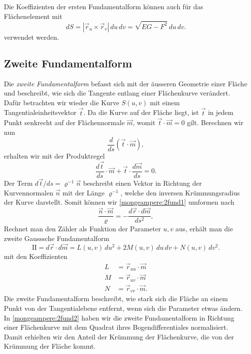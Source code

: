 Die Koeffizienten der ersten Fundamentalform können auch für das Flächenelement mit
\begin{equation}
  d S = |\vec r_u \times \vec r_v|\,d u \,d v = \!\sqrt{EG-F^2} \,d u \,d v.
  \label{mongeampere:ds}
\end{equation}
verwendet werden.

\subsection{Zweite Fundamentalform}
Die \emph{zweite Fundamentalform} befasst sich mit der äusseren Geometrie einer 
%
%
Fläche und beschreibt, wie sich die Tangente entlang einer Flächenkurve verändert.
Dafür betrachten wir wieder die Kurve $S(u,v)$ mit einem Tangentialeinheitsvektor 
$\vec t$.
Da die Kurve auf der Fläche liegt, ist $\vec t$ in jedem Punkt senkrecht auf der 
Flächennormale $\vec m$, womit $\vec t \cdot \vec m = 0$ gilt. 
Berechnen wir nun 
\begin{equation*}
  \frac{d }{d s}(\vec t \cdot \vec m),
\end{equation*}
erhalten wir mit der Produktregel
\begin{equation}
  \frac{d \vec t}{d s} \cdot \vec m + \vec t \cdot \frac{d \vec m}{d s} = 0. 
  \label{mongeampere:2fund1}
\end{equation}
Der Term $d \vec t / d s = \varrho^{-1} \vec n$ beschreibt einen Vektor in Richtung der Kurvennormalen 
$\vec n$ mit der Länge $\varrho^{-1}$, welche den inversen Krümmungsradius der Kurve 
%
darstellt.
Somit können wir \eqref{mongeampere:2fund1} umformen nach
\begin{equation}
  \frac{\vec n \cdot \vec m}{\varrho} = - \frac{d \vec r \cdot d \vec m }{d s^2},
  \label{mongeampere:2fund2}
\end{equation}
Rechnet man den Zähler als Funktion der Parameter $u, v$ aus, erhält man die zweite 
Gausssche Fundamentalform
\begin{equation*}
  \mathrm{I\!I} = d \vec r \cdot d \vec m  = L(u, v) \,d u^2 + 2 M (u,v) \,d u \,d v + N(u,v) \,d v^2.
\end{equation*}
mit den Koeffizienten
\begin{align*}
  L &= \vec r_{uu} \cdot \vec m \\ 
  M &= \vec r_{uv} \cdot \vec m \\
  N &= \vec r_{vv} \cdot \vec m.
\end{align*}
Die zweite Fundamentalform beschreibt, wie stark sich die Fläche an einem Punkt
von der Tangentialebene entfernt, wenn sich die Parameter etwas ändern.
%
In \eqref{mongeampere:2fund2} haben wir die zweite Fundamentalform in Richtung einer Flächenkurve mit
dem Quadrat ihres Bogendifferentiales normalisiert.
Damit erhielten wir den Anteil der Krümmung der Flächenkurve, die von der Krümmung der Fläche kommt.


